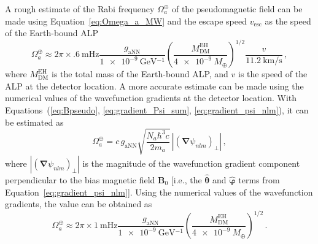 A rough estimate of the Rabi frequency $\Omega_a^{\oplus}$ of the pseudomagnetic field can be made using Equation~\eqref{eq:Omega_a_MW} and the escape speed $v_\mathrm{esc}$ as the speed of the Earth-bound ALP\,\cite{Zhang2026_Dissertation_ipynb_2_theory_EH_ALP}
\begin{equation}
    \Omega_a^{\oplus}
    \approx
    2 \pi \times \SI{.6}{\mHz}
    \frac{g_\mathrm{aNN}}{\SI{1e-9}{\GeV^{-1}}}
    \left(\frac{M_\mathrm{DM}^\mathrm{EH}}{\SI{4e-9}{M_\oplus}}\right)^{1/2}
    \frac{v}{\SI{11.2}{\km\per\s}}
    \,,\label{eq:Omega_a_EH_est}
\end{equation}
where $M_\mathrm{DM}^\mathrm{EH}$ is the total mass of the Earth-bound ALP, and $v$ is the speed of the ALP at the detector location.
A more accurate estimate can be made using the numerical values of the wavefunction gradients at the detector location.
With Equations~(\ref{eq:Bpseudo}, \ref{eq:gradient_Psi_sum}, \ref{eq:gradient_psi_nlm}), it can be estimated as\,\cite{Zhang2026_Dissertation_ipynb_2_theory_EH_ALP}
\begin{equation}
    \Omega_a^{\oplus} = c\, g_\mathrm{aNN} \sqrt{\frac{N_a \hbar^3 c}{2 m_a}}\,\left|\left(\boldsymbol{\nabla}\psi_{nlm}\right)_\perp\right|
    \,,\label{eq:Omega_a_EH}
\end{equation}
where $\left|(\boldsymbol{\nabla}\psi_{nlm})_\perp\right|$ is the magnitude of the wavefunction gradient component perpendicular to the bias magnetic field $\boldsymbol{B}_0$ [i.e., the $\hat{\boldsymbol{\theta}}$ and $\hat{\boldsymbol{\varphi}}$ terms from Equation~\eqref{eq:gradient_psi_nlm}].
Using the numerical values of the wavefunction gradients, the value can be obtained as
\begin{equation}
    \Omega_a^{\oplus}
    \approx
    2 \pi \times \SI{1}{\mHz}
    \frac{g_\mathrm{aNN}}{\SI{1e-9}{\GeV^{-1}}}
    \left(\frac{M_\mathrm{DM}^\mathrm{EH}}{\SI{4e-9}{M_\oplus}}\right)^{1/2}
    \,.
    \label{eq:Omega_a_EH_theta}
\end{equation}
